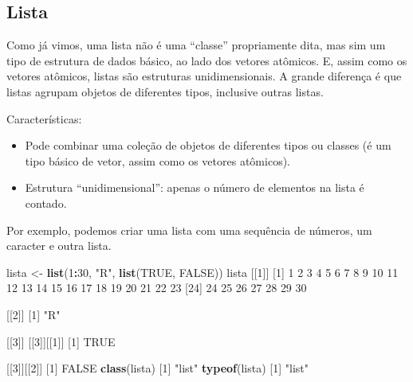 \documentclass[10pt,a4paper]{book}
\newenvironment{Shaded}{\begin{snugshade}}{\end{snugshade}}
\newcommand{\KeywordTok}[1]{\textcolor[rgb]{0.13,0.29,0.53}{\textbf{#1}}}
\newcommand{\DecValTok}[1]{\textcolor[rgb]{0.00,0.00,0.81}{#1}}
\newcommand{\StringTok}[1]{\textcolor[rgb]{0.31,0.60,0.02}{#1}}
\newcommand{\OtherTok}[1]{\textcolor[rgb]{0.56,0.35,0.01}{#1}}
\newcommand{\OperatorTok}[1]{\textcolor[rgb]{0.81,0.36,0.00}{\textbf{#1}}}
\newcommand{\NormalTok}[1]{#1}
\providecommand{\tightlist}{%
  \setlength{\itemsep}{0pt}\setlength{\parskip}{0pt}}
\begin{document}
\subsection{Lista}\label{lista}

Como já vimos, uma lista não é uma ``classe'' propriamente dita, mas sim
um tipo de estrutura de dados básico, ao lado dos vetores atômicos. E,
assim como os vetores atômicos, listas são estruturas unidimensionais. A
grande diferença é que listas agrupam objetos de diferentes tipos,
inclusive outras listas.

Características:

\begin{itemize}
\tightlist
\item
  Pode combinar uma coleção de objetos de diferentes tipos ou classes (é
  um tipo básico de vetor, assim como os vetores atômicos).
\item
  Estrutura ``unidimensional'': apenas o número de elementos na lista é
  contado.
\end{itemize}

Por exemplo, podemos criar uma lista com uma sequência de números, um
caracter e outra lista.

\begin{Shaded}
\begin{Highlighting}[]
\NormalTok{lista <-}\StringTok{ }\KeywordTok{list}\NormalTok{(}\DecValTok{1}\OperatorTok{:}\DecValTok{30}\NormalTok{, }\StringTok{"R"}\NormalTok{, }\KeywordTok{list}\NormalTok{(}\OtherTok{TRUE}\NormalTok{, }\OtherTok{FALSE}\NormalTok{))}
\NormalTok{lista}
\NormalTok{[[}\DecValTok{1}\NormalTok{]]}
\NormalTok{ [}\DecValTok{1}\NormalTok{]  }\DecValTok{1}  \DecValTok{2}  \DecValTok{3}  \DecValTok{4}  \DecValTok{5}  \DecValTok{6}  \DecValTok{7}  \DecValTok{8}  \DecValTok{9} \DecValTok{10} \DecValTok{11} \DecValTok{12} \DecValTok{13} \DecValTok{14} \DecValTok{15} \DecValTok{16} \DecValTok{17} \DecValTok{18} \DecValTok{19} \DecValTok{20} \DecValTok{21} \DecValTok{22} \DecValTok{23}
\NormalTok{[}\DecValTok{24}\NormalTok{] }\DecValTok{24} \DecValTok{25} \DecValTok{26} \DecValTok{27} \DecValTok{28} \DecValTok{29} \DecValTok{30}

\NormalTok{[[}\DecValTok{2}\NormalTok{]]}
\NormalTok{[}\DecValTok{1}\NormalTok{] }\StringTok{"R"}

\NormalTok{[[}\DecValTok{3}\NormalTok{]]}
\NormalTok{[[}\DecValTok{3}\NormalTok{]][[}\DecValTok{1}\NormalTok{]]}
\NormalTok{[}\DecValTok{1}\NormalTok{] }\OtherTok{TRUE}

\NormalTok{[[}\DecValTok{3}\NormalTok{]][[}\DecValTok{2}\NormalTok{]]}
\NormalTok{[}\DecValTok{1}\NormalTok{] }\OtherTok{FALSE}
\KeywordTok{class}\NormalTok{(lista)}
\NormalTok{[}\DecValTok{1}\NormalTok{] }\StringTok{"list"}
\KeywordTok{typeof}\NormalTok{(lista)}
\NormalTok{[}\DecValTok{1}\NormalTok{] }\StringTok{"list"}
\end{Highlighting}
\end{Shaded}
\end{document}
